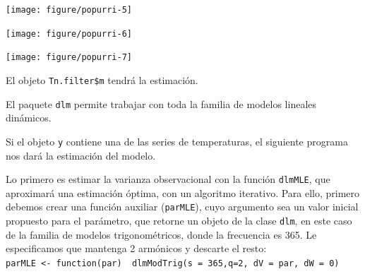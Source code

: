 \documentclass[12pt]{article}\usepackage[]{graphicx}\usepackage[]{color}
\newenvironment{knitrout}{}{} %
\begin{document}
\begin{knitrout}
{}




{\centering \texttt{[image: figure/popurri-5]} 

}




{\centering \texttt{[image: figure/popurri-6]} 

}




{\centering \texttt{[image: figure/popurri-7]} 

}



\end{knitrout}

\newpage

El objeto \verb|Tn.filter$m| tendrá la estimación.
%
%

El paquete \verb|dlm| permite trabajar con toda la familia de modelos lineales dinámicos. %

Si el objeto \verb|y| contiene una de las series de temperaturas, el siguiente programa nos dará la estimación del modelo.

Lo primero es estimar la varianza observacional con la función \verb|dlmMLE|, que aproximará una estimación óptima, con un algoritmo iterativo. Para ello, primero debemos crear una función auxiliar (\verb|parMLE|), cuyo argumento sea un valor inicial propuesto para el parámetro, que retorne un objeto de la clase \verb|dlm|, en este caso de la familia de modelos trigonométricos, donde la frecuencia es 365. Le especificamos que mantenga 2 armónicos y descarte el resto:\\
\verb|parMLE <- function(par)  dlmModTrig(s = 365,q=2, dV = par, dW = 0)|
\end{document}
